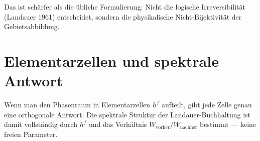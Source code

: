Das ist schärfer als die übliche Formulierung: Nicht die logische
Irreversibilität (Landauer 1961) entscheidet, sondern die physikalische
Nicht-Bijektivität der Gebietsabbildung. 

\section{Elementarzellen und spektrale Antwort}

Wenn man den Phasenraum in Elementarzellen $h^f$ aufteilt, gibt jede
Zelle genau eine orthogonale Antwort. Die spektrale Struktur der
Landauer-Buchhaltung ist damit vollständig durch $h^f$ und das Verhältnis
$W_{\text{vorher}}/W_{\text{nachher}}$ bestimmt --- keine freien Parameter.
